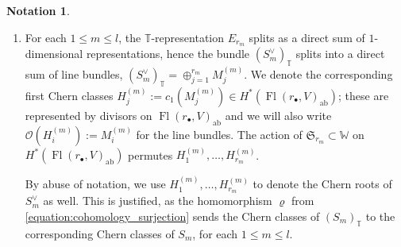 \documentclass[a4paper,12pt]{amsart}
\numberwithin{equation}{section}
\theoremstyle{definition}
\newtheorem{notation}[theorem]{Notation}
\newcommand{\T}{\mathbb{T}}
\newcommand{\W}{\mathbb{W}}
\newcommand{\Fl}{\operatorname{Fl}}
\begin{document}
\begin{notation}
\begin{enumerate}
\begin{equation}
        \end{equation}
        \item
        For each $1\leq m\leq l$, the $\T$-representation $E_{r_m}$ splits as a direct sum of $1$-dimensional representations, hence the bundle $(S_m^\vee)_\T$ splits into a direct sum of line bundles, $(S_m^\vee)_\T=\oplus_{j=1}^{r_m}M_j^{(m)}$.
        We denote the corresponding first Chern classes $H^{(m)}_j:=c_1(M_j^{(m)})\in H^*(\Fl(r_\bullet,V)_{\operatorname{ab}})$; these are represented by divisors on 
        $\Fl(r_\bullet,V)_{\operatorname{ab}}$ and we will also write $\mathcal{O}(H^{(m)}_i):=M^{(m)}_i$ for the line bundles. 
        The action of $\mathfrak{S}_{r_m}\subset\W$ on $H^*(\Fl(r_\bullet,V)_{\operatorname{ab}})$ permutes $H^{(m)}_1,\dots,H^{(m)}_{r_m}$.
        
        By abuse of notation, we use $H^{(m)}_1,\dots,H^{(m)}_{r_m}$ to denote the Chern roots of $S_m^\vee$ as well. This is justified, as the homomorphism $\varrho$ from \eqref{equation:cohomology_surjection} sends the Chern classes of $(S_m)_\T$ to the corresponding Chern classes of $S_m$, for each $1\leq m\leq l$. 
        

\end{enumerate}
\end{notation}
\end{document}
